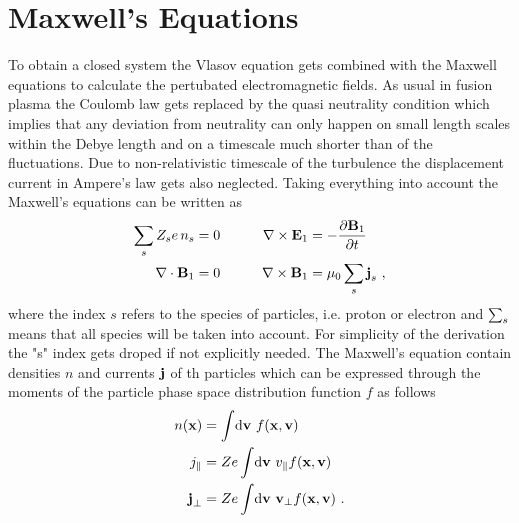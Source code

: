 \section{Maxwell's Equations}
\label{sec:maxwellEquations}

To obtain a closed system the Vlasov equation gets combined with the Maxwell equations to calculate the pertubated electromagnetic fields. As usual in fusion plasma the Coulomb law gets replaced by the quasi neutrality condition which implies that any deviation from neutrality can only happen on small length scales within the Debye length and on a timescale much shorter than of the fluctuations. Due to non-relativistic timescale of the turbulence the displacement current in Ampere's law gets also neglected. Taking everything into account the Maxwell's equations can be written as
\begin{gather}
	\begin{aligned}
		\sum_s Z_s e \, n_s &= 0  &\qquad \nabla \times \boldsymbol{\mathbf{E}}_1 &= - \frac{\partial \boldsymbol{\mathbf{B}}_1}{\partial t}\\
		\nabla \cdot \boldsymbol{\mathbf{B}}_1 &= 0 &\qquad \nabla \times \boldsymbol{\mathbf{B}}_1 &= \mu_0 \sum_s \boldsymbol{\mathbf{j}}_s~,
	\end{aligned}
	\label{eq:maxwellEquations}
\end{gather}
where the index $s$ refers to the species of particles, i.e. proton or electron and $\sum_s$ means that all species will be taken into account. For simplicity of the derivation the "s" index gets droped if not explicitly needed. The Maxwell's equation contain densities $n$ and currents $\boldsymbol{\mathbf{j}}$ of th particles which can be expressed through the moments of the particle phase space distribution function $f$ as follows
\begin{gather}
	\begin{aligned}
		n(\boldsymbol{\mathbf{x}}) &= \int \! \mathrm{d}\boldsymbol{\mathbf{v}} ~ f(\boldsymbol{\mathbf{x}}, \boldsymbol{\mathbf{v}}) \\
		j_\parallel &= Ze \int \! \mathrm{d}\boldsymbol{\mathbf{v}} ~ v_\parallel f(\boldsymbol{\mathbf{x}}, \boldsymbol{\mathbf{v}}) \\
		\boldsymbol{\mathbf{j}}_\perp &= Ze \int \! \mathrm{d}\boldsymbol{\mathbf{v}} ~ \boldsymbol{\mathbf{v}}_\perp f(\boldsymbol{\mathbf{x}}, \boldsymbol{\mathbf{v}})~.
	\end{aligned}
	\label{eq:momentsParticleSpace}
\end{gather}
\newpage